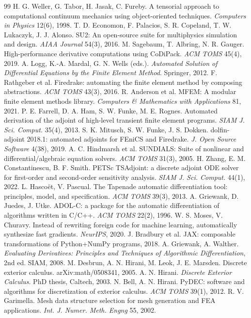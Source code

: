 \documentclass[11pt,a4paper]{article}
\begin{document}
\begin{thebibliography}{99}\footnotesize
{} H. G. Weller, G. Tabor, H. Jasak, C. Fureby. A tensorial approach to computational continuum mechanics using object-oriented techniques. \emph{Computers in Physics} 12(6), 1998.
 T. D. Economon, F. Palacios, S. R. Copeland, T. W. Lukaczyk, J. J. Alonso. SU2: An open-source suite for multiphysics simulation and design. \emph{AIAA Journal} 54(3), 2016.
 M. Sagebaum, T. Albring, N. R. Gauger. High-performance derivative computations using CoDiPack. \emph{ACM TOMS} 45(4), 2019.
 A. Logg, K.-A. Mardal, G. N. Wells (eds.). \emph{Automated Solution of Differential Equations by the Finite Element Method}. Springer, 2012.
 F. Rathgeber et al. Firedrake: automating the finite element method by composing abstractions. \emph{ACM TOMS} 43(3), 2016.
 R. Anderson et al. MFEM: A modular finite element methods library. \emph{Computers \& Mathematics with Applications} 81, 2021.
 P. E. Farrell, D. A. Ham, S. W. Funke, M. E. Rognes. Automated derivation of the adjoint of high-level transient finite element programs. \emph{SIAM J. Sci. Comput.} 35(4), 2013.
 S. K. Mitusch, S. W. Funke, J. S. Dokken. dolfin-adjoint 2018.1: automated adjoints for FEniCS and Firedrake. \emph{J. Open Source Software} 4(38), 2019.
 A. C. Hindmarsh et al. SUNDIALS: Suite of nonlinear and differential/algebraic equation solvers. \emph{ACM TOMS} 31(3), 2005.
 H. Zhang, E. M. Constantinescu, B. F. Smith. PETSc TSAdjoint: a discrete adjoint ODE solver for first-order and second-order sensitivity analysis. \emph{SIAM J. Sci. Comput.} 44(1), 2022.
 L. Hascoët, V. Pascual. The Tapenade automatic differentiation tool: principles, model, and specification. \emph{ACM TOMS} 39(3), 2013.
 A. Griewank, D. Juedes, J. Utke. ADOL-C: a package for the automatic differentiation of algorithms written in C/C++. \emph{ACM TOMS} 22(2), 1996.
 W. S. Moses, V. Churavy. Instead of rewriting foreign code for machine learning, automatically synthesize fast gradients. \emph{NeurIPS}, 2020.
 J. Bradbury et al. JAX: composable transformations of Python+NumPy programs, 2018.
 A. Griewank, A. Walther. \emph{Evaluating Derivatives: Principles and Techniques of Algorithmic Differentiation}, 2nd ed. SIAM, 2008.
 M. Desbrun, A. N. Hirani, M. Leok, J. E. Marsden. Discrete exterior calculus. arXiv:math/0508341, 2005.
 A. N. Hirani. \emph{Discrete Exterior Calculus}. PhD thesis, Caltech, 2003.
 N. Bell, A. N. Hirani. PyDEC: software and algorithms for discretization of exterior calculus. \emph{ACM TOMS} 39(1), 2012.
 R. V. Garimella. Mesh data structure selection for mesh generation and FEA applications. \emph{Int. J. Numer. Meth. Engng} 55, 2002.
\end{thebibliography}
\end{document}
